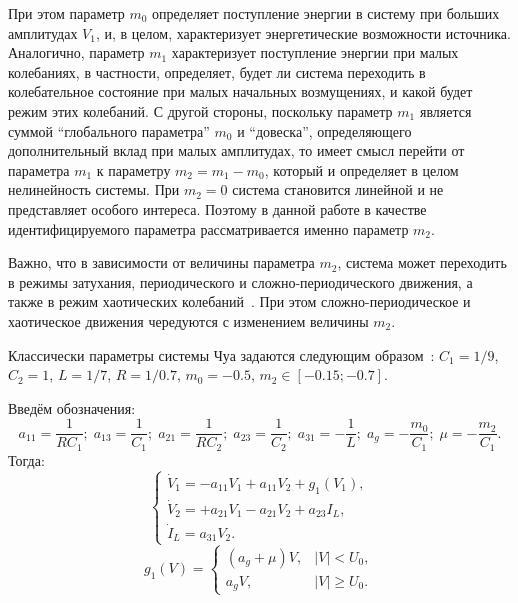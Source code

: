 При этом параметр \(m_0\) определяет поступление энергии в систему
при больших амплитудах \(V_1\), и, в целом, характеризует
энергетические возможности источника.
Аналогично, параметр \(m_1\) характеризует поступление энергии
при малых колебаниях, в частности, определяет, будет ли
система переходить в колебательное состояние при малых начальных
возмущениях, и какой будет режим этих колебаний.
С другой стороны, поскольку параметр \(m_1\) является суммой
``глобального параметра'' \(m_0\) и ``довеска'',
определяющего дополнительный вклад при малых амплитудах,
то имеет смысл перейти от параметра \(m_1\) к параметру
\( m_2 = m_1 - m_0 \), который
и определяет в целом нелинейность
системы. При \( m_2 = 0 \) система становится линейной
и не представляет особого интереса. Поэтому
в данной работе в качестве
идентифицируемого параметра рассматривается именно параметр \(m_2\).

Важно, что в зависимости от величины параметра $m_2$,
система может переходить в режимы затухания,
периодического и сложно-периодического движения, а также в режим
хаотических колебаний~\cite{anisch_nonlin_eff,magni_new_meth}. При этом сложно-периодическое и хаотическое
движения чередуются с изменением величины \(m_2\).


Классически параметры системы Чуа задаются следующим образом~\cite{buga_chua}:
$C_1 = 1/9$, $C_2 = 1$, $L= 1/7$, $R = 1/0.7$, $m_0=-0.5$, $ m_2 \in [ -0.15; -0.7 ] $.

Введём обозначения:
\[
  a_{11} = \frac{1}{R C_1}; \;
  a_{13} = \frac{1}{C_1}; \;
  a_{21} = \frac{1}{R C_2}; \;
  a_{23} = \frac{1}{C_2}; \;
  a_{31} = -\frac{1}{L}; \;
  a_g = - \frac{m_0}{C_1}; \;
  \mu = - \frac{m_2}{C_1}.
\]
%
Тогда:
%
\begin{equation}
\begin{cases}
  \dot{V}_1  = -a_{11} V_1 + a_{11}  V_2  + g_1(V_1) , \\
  \dot{V}_2  = +a_{21} V_1 - a_{21}  V_2  + a_{23} I_L    , \\
  \dot{I}_L  =  a_{31} V_2.
\end{cases}
\label{atu:eq:chua2}
\end{equation}
%
%
\begin{equation}
g_1(V) =
\begin{cases}
  ( a_g + \mu ) V , & |V| <   U_0, \\
  a_g V           , & |V| \ge U_0.
\end{cases}
\label{atu:eq:diodchua2}
\end{equation}

